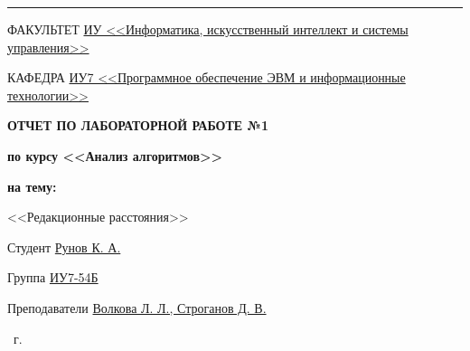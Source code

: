 \begin{titlepage}
\begin{center}
        \vspace{0.2cm}
        \rule{\linewidth}{2.8pt}

        \begin{flushleft}
            {ФАКУЛЬТЕТ \uline{ИУ <<Информатика, искусственный интеллект и системы управления>> \hfill}}

            \vspace{0.5cm}

            {КАФЕДРА \uline{ИУ7 <<Программное обеспечение ЭВМ и информационные технологии>> \hfill}}
        \end{flushleft}

        \vfill

        {
            \Large{\textbf{
                {ОТЧЕТ ПО ЛАБОРАТОРНОЙ РАБОТЕ №1}
            }}

            \Large{\textbf{
                {по курсу <<Анализ алгоритмов>>}
            }}

            \Large{\textbf{
                {на тему:}
            }}

            \large{<<Редакционные расстояния>>}

            \vspace{0.5cm}
        }

        \vspace{0.5cm}

        \fontsize{14pt}{14pt}\selectfont

        \begin{flushleft}
            {Студент \uline{Рунов К. А.\hfill}}

            \vspace{0.5cm}

            {Группа \uline{ИУ7-54Б \hfill}}

            \vspace{0.5cm}

            {Преподаватели \uline{Волкова Л. Л., Строганов Д. В.\hfill}}

            \vspace{0.5cm}

        \end{flushleft}

        \vfill

        \the\year\ г.

    \end{center}
\end{titlepage}

